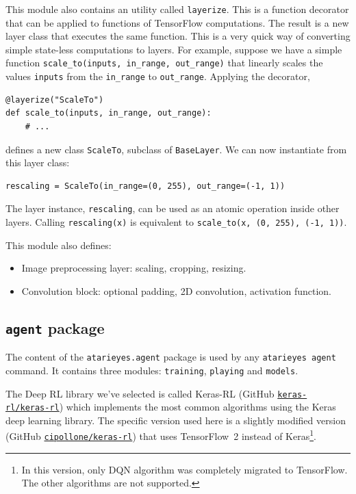 This module also contains an utility called \texttt{layerize}. This is a
function decorator that can be applied to functions of TensorFlow
computations. The result is a new layer class that executes the same function.
This is a very quick way of converting simple state-less computations to
layers. For example, suppose we have a simple function
\lstinline[style=inlinepy]|scale_to(inputs, in_range, out_range)| that
linearly scales the values \texttt{inputs} from the \verb|in_range| to
\verb|out_range|. Applying the decorator,
\begin{lstlisting}[style=python]
@layerize("ScaleTo")
def scale_to(inputs, in_range, out_range):
	# ...
\end{lstlisting}
defines a new class \texttt{ScaleTo}, subclass of \texttt{BaseLayer}. We can
now instantiate from this layer class:
\begin{lstlisting}[style=python]
rescaling = ScaleTo(in_range=(0, 255), out_range=(-1, 1))
\end{lstlisting}
The layer instance, \texttt{rescaling}, can be used as an atomic operation
inside other layers. Calling \lstinline[style=inlinepy]|rescaling(x)| is
equivalent to \lstinline[style=inlinepy]|scale_to(x, (0, 255), (-1, 1))|.

This module also defines:
\begin{itemize}
	\item Image preprocessing layer: scaling, cropping, resizing.
	\item Convolution block: optional padding, 2D convolution, activation
		function.
\end{itemize}

\subsection{\texttt{agent} package}

\label{sec:impl-agent}

The content of the \verb|atarieyes.agent| package is used by any
\verb|atarieyes agent| command. It contains three modules: \texttt{training},
\texttt{playing} and \texttt{models}.

The Deep RL library we've selected is called Keras-RL (GitHub
\href{https://github.com/keras-rl/keras-rl}{\texttt{keras-rl/keras-rl}})
which implements the most common algorithms using the Keras deep learning
library. The specific version used here is a slightly modified version (GitHub
\href{https://github.com/cipollone/keras-rl}{\texttt{cipollone/keras-rl}})
that uses TensorFlow~2 instead of Keras\footnote{In this version, only DQN
algorithm was completely migrated to TensorFlow. The other algorithms are not
supported.}.


